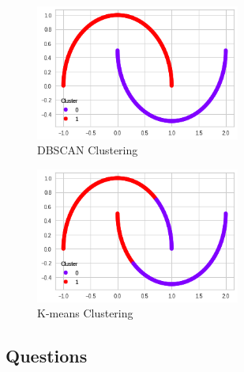 \documentclass[12pt,letterpaper, onecolumn]{exam}
\begin{document}
\begin{figure}[!h]
\centering
\caption{DBSCAN Clustering}
\includegraphics[width = 0.6\textwidth]{../images/DBSCAN_plot}
\end{figure}
\newpage
\begin{figure}[!h]
\centering
\caption{K-means Clustering}
\includegraphics[width = 0.6\textwidth]{../images/K-Means_plot}
\end{figure}

\subsection*{Questions}
\end{document}
